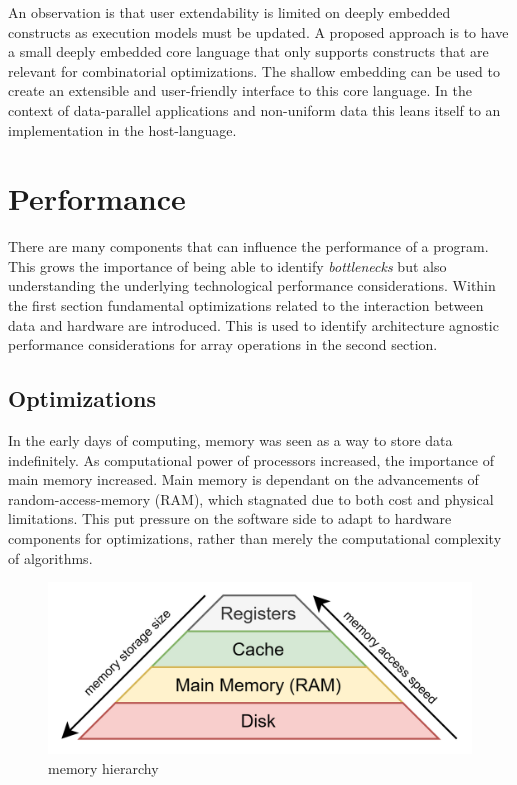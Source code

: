 \documentclass{article}
\begin{document}
An observation is that user extendability is limited on deeply embedded constructs as execution models must be updated.
A proposed approach is to have a small deeply embedded core language that only supports constructs that are relevant for combinatorial optimizations\cite{shallow-and-deep}. 
The shallow embedding can be used to create an extensible and user-friendly interface to this core language.
In the context of data-parallel applications and non-uniform data this leans itself to an implementation in the host-language.

\newpage

\section{Performance}

There are many components that can influence the performance of a program.
This grows the importance of being able to identify {\it bottlenecks} but also understanding the underlying technological performance considerations\cite{programming-optimization}.
Within the first section fundamental optimizations related to the interaction between data and hardware are introduced.
This is used to identify architecture agnostic performance considerations for array operations in the second section.

\subsection{Optimizations}

In the early days of computing, memory was seen as a way to store data indefinitely.
As computational power of processors increased, the importance of main memory increased.
Main memory is dependant on the advancements of random-access-memory (RAM), which stagnated due to both cost and physical limitations\cite{memory}. 
This put pressure on the software side to adapt to hardware components for optimizations, rather than merely the computational complexity of algorithms.

\begin{figure}[ht]
    \centering
    \includegraphics[scale=0.2]{memoryhierarchy}
    \caption{ memory hierarchy }
\end{figure}
\end{document}
